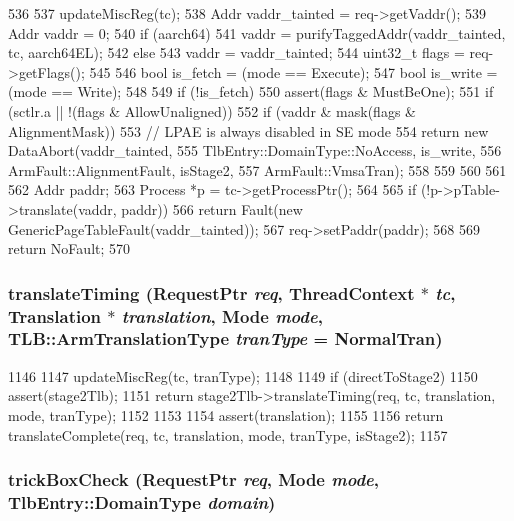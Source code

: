\begin{DoxyCode}
536 {
537     updateMiscReg(tc);
538     Addr vaddr_tainted = req->getVaddr();
539     Addr vaddr = 0;
540     if (aarch64)
541         vaddr = purifyTaggedAddr(vaddr_tainted, tc, aarch64EL);
542     else
543         vaddr = vaddr_tainted;
544     uint32_t flags = req->getFlags();
545 
546     bool is_fetch = (mode == Execute);
547     bool is_write = (mode == Write);
548 
549     if (!is_fetch) {
550         assert(flags & MustBeOne);
551         if (sctlr.a || !(flags & AllowUnaligned)) {
552             if (vaddr & mask(flags & AlignmentMask)) {
553                 // LPAE is always disabled in SE mode
554                 return new DataAbort(vaddr_tainted,
555                         TlbEntry::DomainType::NoAccess, is_write,
556                                      ArmFault::AlignmentFault, isStage2,
557                                      ArmFault::VmsaTran);
558             }
559         }
560     }
561 
562     Addr paddr;
563     Process *p = tc->getProcessPtr();
564 
565     if (!p->pTable->translate(vaddr, paddr))
566         return Fault(new GenericPageTableFault(vaddr_tainted));
567     req->setPaddr(paddr);
568 
569     return NoFault;
570 }
\end{DoxyCode}
\hypertarget{classArmISA_1_1TLB_aece4eb62debdc9703b211d68ce771521}{
\subsubsection[{translateTiming}]{ translateTiming ({\bf RequestPtr} {\em req}, \/  {\bf ThreadContext} $\ast$ {\em tc}, \/  {\bf Translation} $\ast$ {\em translation}, \/  {\bf Mode} {\em mode}, \/  {\bf TLB::ArmTranslationType} {\em tranType} = {\ttfamily NormalTran})}}
\label{classArmISA_1_1TLB_aece4eb62debdc9703b211d68ce771521}



\begin{DoxyCode}
1146 {
1147     updateMiscReg(tc, tranType);
1148 
1149     if (directToStage2) {
1150         assert(stage2Tlb);
1151         return stage2Tlb->translateTiming(req, tc, translation, mode, tranType);
1152     }
1153 
1154     assert(translation);
1155 
1156     return translateComplete(req, tc, translation, mode, tranType, isStage2);
1157 }
\end{DoxyCode}
\hypertarget{classArmISA_1_1TLB_aa14d4829f5c7bce966547df0babb7487}{
\subsubsection[{trickBoxCheck}]{ trickBoxCheck ({\bf RequestPtr} {\em req}, \/  {\bf Mode} {\em mode}, \/  {\bf TlbEntry::DomainType} {\em domain})}}
\label{classArmISA_1_1TLB_aa14d4829f5c7bce966547df0babb7487}



